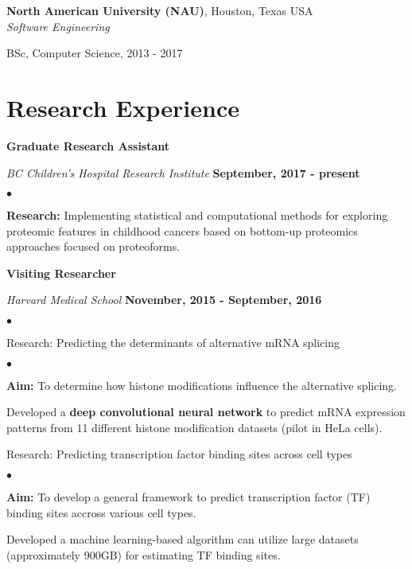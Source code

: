 \documentclass[margin,line]{res}
\newenvironment{list1}{
  \begin{list}{\ding{113}}{%
      \setlength{\itemsep}{0in}
      \setlength{\parsep}{0in} \setlength{\parskip}{0in}
      \setlength{\topsep}{0in} \setlength{\partopsep}{0in}
      \setlength{\leftmargin}{0.17in}}}{\end{list}}
\newenvironment{list2}{
  \begin{list}{$\bullet$}{%
      \setlength{\itemsep}{0in}
      \setlength{\parsep}{0in} \setlength{\parskip}{0in}
      \setlength{\topsep}{0in} \setlength{\partopsep}{0in}
      \setlength{\leftmargin}{0.2in}}}{\end{list}}
\begin{document}
\begin{resume}
{\bf North American University (NAU)}, Houston, Texas USA\\
{\em Software Engineering}
\begin{list1}
\item[] BSc, Computer Science,  2013 - 2017
\end{list1}


\section{\sc Research Experience}

{\bf Graduate Research Assistant}

\vspace{-.3cm}
{\em BC Children's Hospital Research Institute} \hfill {\bf September, 2017 - present}\\
\vspace{-.3cm}
\begin{list2}
\item {\bf Research:} Implementing statistical and computational methods for exploring proteomic features in childhood cancers based on bottom-up proteomics approaches focused on proteoforms.
\end{list2}

{\bf Visiting Researcher}

\vspace{-.3cm}
{\em Harvard Medical School} \hfill {\bf November, 2015 - September, 2016}\\
\vspace{-.3cm}
\begin{list2}
\item Research: Predicting the determinants of alternative mRNA splicing
\begin{list2}
\item {\bf Aim:} To determine how histone modifications influence the alternative splicing.
\item Developed a {\bf deep convolutional neural network} to predict mRNA expression patterns from 11 different histone modification datasets (pilot in HeLa cells).

\end{list2}
\item Research: Predicting transcription factor binding sites across cell types
\begin{list2}
\item {\bf Aim:} To develop a general framework to predict transcription factor (TF) binding sites accross various cell types.
\item Developed a machine learning-based algorithm can utilize large datasets (approximately 900GB) for estimating TF binding sites.
\end{list2}
\end{list2}


\end{resume}
\end{document}
